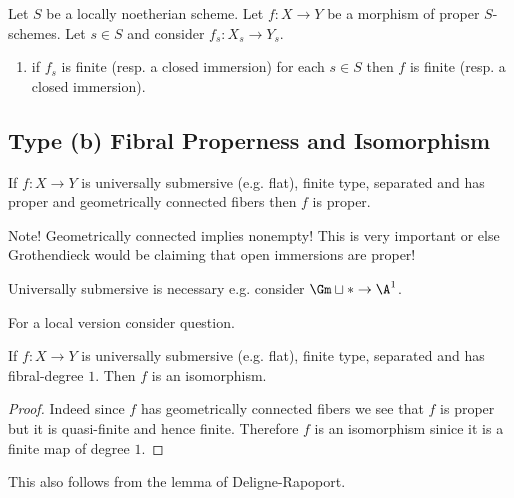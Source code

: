 \documentclass[12pt]{article}
\begin{document}
\begin{cor}
Let $S$ be a locally noetherian scheme. Let $f : X \to Y$ be a morphism of proper $S$-schemes. Let $s \in S$ and consider $f_s : X_s \to Y_s$. 
\begin{enumerate}
\item if $f_s$ is finite (resp. a closed immersion) for each $s \in S$ then $f$ is finite (resp. a closed immersion).
\end{enumerate}
\end{cor}



\subsection{Type (b) Fibral Properness and Isomorphism}

\begin{prop}[EGA IV.15.7.10]
If $f : X \to Y$ is universally submersive (e.g. flat), finite type, separated and has proper and geometrically connected fibers then $f$ is proper.
\end{prop}

\begin{rmk}
Note! Geometrically connected implies nonempty! This is very important or else Grothendieck would be claiming that open immersions are proper!
\end{rmk}

\begin{rmk}
Universally submersive is necessary e.g. consider $\Gm \sqcup * \to \A^1$.
\end{rmk}

\begin{rmk}
For a local version consider  question.
\end{rmk}

\begin{cor}
If $f : X \to Y$ is universally submersive (e.g. flat), finite type, separated and has fibral-degree $1$. Then $f$ is an isomorphism.
\end{cor}

\begin{proof}
Indeed since $f$ has geometrically connected fibers we see that $f$ is proper but it is quasi-finite and hence finite. Therefore $f$ is an isomorphism sinice it is a finite map of degree $1$. 
\end{proof}

\begin{rmk}
This also follows from the lemma of Deligne-Rapoport.
\end{rmk}
\end{document}

